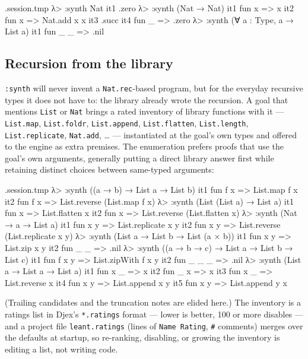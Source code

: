\documentclass[11pt,oneside]{article}
\newcommand{\code}[1]{\texttt{#1}}
\newenvironment{session}
 {\VerbatimEnvironment\begin{VerbatimOut}{\jobname.session.tmp}}
 {\end{VerbatimOut}%
  \begin{sessionouter}%
  \VerbatimInput[fontsize=\footnotesize, breaklines=true,
    breaksymbolleft={\textcolor{stone}{\footnotesize$\hookrightarrow$}},
    formatcom=\color{ink}, tabsize=4]{\jobname.session.tmp}%
  \end{sessionouter}}
\begin{document}
\begin{session}
λ> :synth Nat
  it1  .zero
λ> :synth (Nat → Nat)
  it1  fun x => x
  it2  fun x => Nat.add x x
  it3  .succ
  it4  fun _ => .zero
λ> :synth (∀ a : Type, a → List a)
  it1  fun _ _ => .nil
\end{session}

\subsection{Recursion from the library}\label{sec:synth-library}

\code{:synth} will never invent a \code{Nat.rec}-based program, but
for the everyday recursive types it does not have to: the library
already wrote the recursion. A goal that mentions \code{List} or
\code{Nat} brings a rated inventory of library functions with it ---
\code{List.map}, \code{List.foldr}, \code{List.append},
\code{List.flatten}, \code{List.length}, \code{List.replicate},
\code{Nat.add}, \dots{} --- instantiated at the goal's own types and
offered to the engine as extra premises. The enumeration prefers
proofs that use the goal's own arguments, generally putting a direct
library answer first while retaining distinct choices between
same-typed arguments:

\begin{session}
λ> :synth ((a → b) → List a → List b)
  it1  fun f x => List.map f x
  it2  fun f x => List.reverse (List.map f x)
λ> :synth (List (List a) → List a)
  it1  fun x => List.flatten x
  it2  fun x => List.reverse (List.flatten x)
λ> :synth (Nat → a → List a)
  it1  fun x y => List.replicate x y
  it2  fun x y => List.reverse (List.replicate x y)
λ> :synth (List a → List b → List (a × b))
  it1  fun x y => List.zip x y
  it2  fun _ _ => .nil
λ> :synth ((a → b → c) → List a → List b → List c)
  it1  fun f x y => List.zipWith f x y
  it2  fun _ _ _ => .nil
λ> :synth (List a → List a → List a)
  it1  fun x _ => x
  it2  fun _ x => x
  it3  fun x _ => List.reverse x
  it4  fun x y => List.append x y
  it5  fun x y => List.append y x
\end{session}

(Trailing candidates and the truncation notes are elided here.) The
inventory is a ratings list in Djex's \code{*.ratings} format ---
lower is better, 100 or more disables --- and a project file
\code{leant.ratings} (lines of \code{Name Rating}, \code{\#}
comments) merges over the defaults at startup, so re-ranking,
disabling, or growing the inventory is editing a list, not writing
code.
\end{document}
